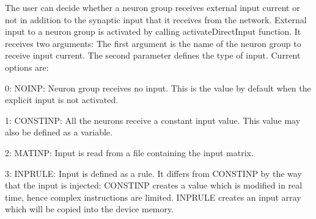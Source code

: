 The user can decide whether a neuron group receives external input current or not in addition to the synaptic input that it receives from the network. External input to a neuron group is activated by calling {\ttfamily activate\+Direct\+Input} function. It receives two arguments\+: The first argument is the name of the neuron group to receive input current. The second parameter defines the type of input. Current options are\+:


\begin{DoxyItemize}
\item 0\+: N\+O\+I\+N\+P\+: Neuron group receives no input. This is the value by default when the explicit input is not activated.
\item 1\+: C\+O\+N\+S\+T\+I\+N\+P\+: All the neurons receive a constant input value. This value may also be defined as a variable.
\item 2\+: M\+A\+T\+I\+N\+P\+: Input is read from a file containing the input matrix.
\item 3\+: I\+N\+P\+R\+U\+L\+E\+: Input is defined as a rule. It differs from C\+O\+N\+S\+T\+I\+N\+P by the way that the input is injected\+: C\+O\+N\+S\+T\+I\+N\+P creates a value which is modified in real time, hence complex instructions are limited. I\+N\+P\+R\+U\+L\+E creates an input array which will be copied into the device memory. 
\end{DoxyItemize}